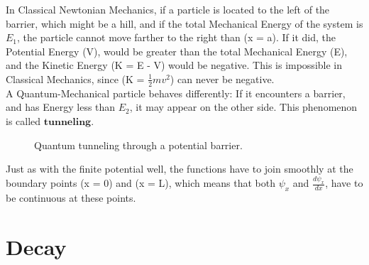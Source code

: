 \documentclass[a4paper, 10pt, onepage]{elegantbook}
\begin{document}
{In Classical Newtonian Mechanics, if a particle is located to the left of the barrier, which might be a hill, and if the total Mechanical Energy of the system is $E_1$, the particle cannot move farther to the right than (x = a). If it did, the Potential Energy (V), would be greater than the total Mechanical Energy (E), and the Kinetic Energy (K = E - V) would be negative. This is impossible in Classical Mechanics, since (K = $\frac{1}{2} mv^2$) can never be negative.  \\

A Quantum-Mechanical particle behaves differently: If it encounters a barrier, and has Energy less than $E_2$, it may appear on the other side. This phenomenon is called $\mathbf{\textbf{tunneling}}$.  \\

\begin{figure}[htbp]
\centering
{}
\caption{Quantum tunneling through a potential barrier.}
\end{figure}

Just as with the finite potential well, the functions have to join smoothly at the boundary points (x = 0) and (x = L), which means that both $\psi_x$ and $\frac{d \psi_x}{dx}$, have to be continuous at these points.





\chapter{Decay}
}
\end{document}
